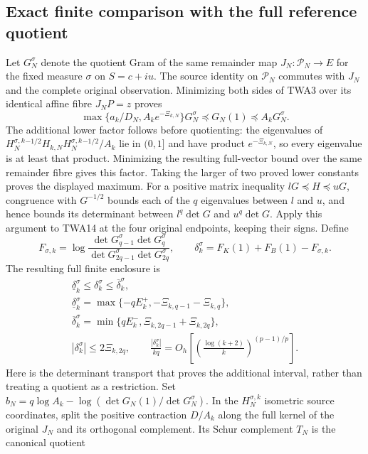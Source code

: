 \subsection{Exact finite comparison with the full reference quotient}

Let $G_N^\sigma$ denote the quotient Gram of the same remainder
map $J_N:\mathcal P_N\to E$ for the fixed measure $\sigma$ on
$S=c+iu$. The source identity on $\mathcal P_N$ commutes with
$J_N$ and the complete original observation. Minimizing both sides
of TWA3 over its identical affine fibre $J_NP=z$ proves
\[
\max\{a_k/D_N,A_ke^{-\Xi_{k,N}}\}G_N^\sigma
       \preceq G_N(1)\preceq A_kG_N^\sigma.
\tag{TWA14}
\]
The additional lower factor follows before quotienting:
the eigenvalues of $H_N^{\sigma,k}{}^{-1/2}H_{k,N}
H_N^{\sigma,k}{}^{-1/2}/A_k$ lie in $(0,1]$ and have product
$e^{-\Xi_{k,N}}$, so every eigenvalue is at least that product.
Minimizing the resulting full-vector bound over the same
remainder fibre gives this factor. Taking the larger of two
proved lower constants proves the displayed maximum.
For a positive matrix inequality $lG\preceq H\preceq uG$,
congruence with $G^{-1/2}$ bounds each of the $q$ eigenvalues
between $l$ and $u$, and hence bounds its determinant between
$l^q\det G$ and $u^q\det G$. Apply this argument to TWA14
at the four original endpoints, keeping their signs. Define
\[
F_{\sigma,k}=\log\frac{\det G_{q-1}^\sigma\det G_q^\sigma}
{\det G_{2q-1}^\sigma\det G_{2q}^\sigma},\qquad
\delta_k^\sigma=F_K(1)+F_B(1)-F_{\sigma,k}.
\]
The resulting full finite enclosure is
\[
\begin{gathered}
 \underline\delta_k^\sigma\leq\delta_k^\sigma
                         \leq\overline\delta_k^\sigma,\\
 \underline\delta_k^\sigma
 =\max\{-qE_k^+,-\Xi_{k,q-1}-\Xi_{k,q}\},\\
 \overline\delta_k^\sigma
 =\min\{qE_k^-,\Xi_{k,2q-1}+\Xi_{k,2q}\},\\
 |\delta_k^\sigma|\leq2\Xi_{k,2q},\qquad
 \frac{|\delta_k^\sigma|}{kq}
 =O_h\!\left[
 \left(\frac{\log(k+2)}{k}\right)^{(p-1)/p}\right].
\end{gathered}\tag{TWA15}
\]
Here is the determinant transport that proves the additional
interval, rather than treating a quotient as a restriction.
Set $b_N=q\log A_k-\log(\det G_N(1)/\det G_N^\sigma)$.
In the $H_N^{\sigma,k}$ isometric source coordinates,
split the positive contraction $D/A_k$ along the full kernel
of the original $J_N$ and its orthogonal complement.
Its Schur complement $T_N$ is the canonical quotient
